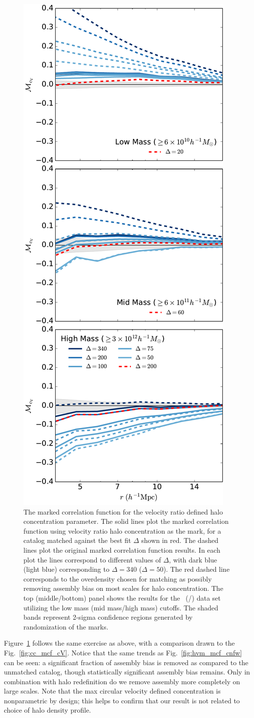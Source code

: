 \documentclass[usenatbib,fleqn]{mnras}
\begin{document}
\begin{figure}
	\centering
	\includegraphics[width=.4\textwidth]{match_mcf_cV.pdf}
	\caption{The marked correlation function for the velocity ratio defined halo concentration parameter. The solid lines plot the marked correlation function using velocity ratio halo concentration as the mark, for a catalog matched against the best fit $\Delta$ shown in red. The dashed lines plot the original marked correlation function results. In each plot the lines correspond to different values of $\Delta$, with dark blue (light blue) corresponding to $\Delta = 340$ ($\Delta = 50$). The red dashed line corresponds to the overdensity chosen for matching as possibly removing assembly bias on most scales for halo concentration. The top (middle/bottom) panel shows the results for the
\simA \ (\simB /\simC) data set utilizing the low mass (mid mass/high mass) cutoffs. The shaded bands represent 2-sigma confidence regions generated by randomization of the marks.}
	\label{fig:hvm_mcf_cV}
\end{figure}

Figure~\ref{fig:hvm_mcf_cV} follows the same exercise as above, with a comparison drawn to the Fig.~\ref{fig:cc_mcf_cV}. Notice that the same trends as Fig.~\ref{fig:hvm_mcf_cnfw} can be seen: a significant fraction of assembly bias is removed as compared to the unmatched catalog, though statistically significant assembly bias remains. Only in combination with halo redefinition do we remove assembly more completely on large scales. Note that the max circular velocity defined concentration is nonparametric by design; this helps to confirm that our result is not related to choice of halo density profile.
\end{document}
